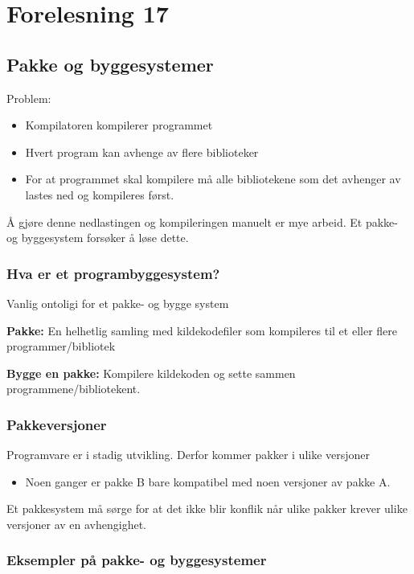 \documentclass{article}
\begin{document}
    \section{Forelesning 17}

    \subsection{Pakke og byggesystemer}
    Problem:

    \begin{itemize}
        \item Kompilatoren kompilerer programmet
        \item Hvert program kan avhenge av flere biblioteker
        \item For at programmet skal kompilere må alle bibliotekene som det avhenger av lastes ned og kompileres først.
    \end{itemize}

    Å gjøre denne nedlastingen og kompileringen manuelt er mye arbeid. Et pakke- og byggesystem forsøker å løse dette.

    \subsubsection{Hva er et programbyggesystem?}
    Vanlig ontoligi for et pakke- og bygge system

    \textbf{Pakke:} En helhetlig samling med kildekodefiler som kompileres til et eller flere programmer/bibliotek
\medskip

\textbf{Bygge en pakke: } Kompilere kildekoden og sette sammen programmene/bibliotekent.


\subsubsection{Pakkeversjoner}
Programvare er i stadig utvikling. Derfor kommer pakker i ulike versjoner

\begin{itemize}
    \item Noen ganger er pakke B bare kompatibel med noen versjoner av pakke A.
\end{itemize}

Et pakkesystem må sørge for at det ikke blir konflik når ulike pakker krever ulike versjoner av en avhengighet.

\subsubsection{Eksempler på pakke- og byggesystemer}
\end{document}
